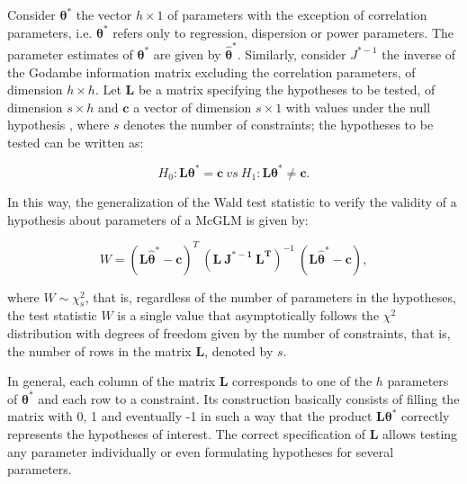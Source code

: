 \documentclass[AMA,STIX1COL]{WileyNJD-v2}
\begin{document}

Consider $\boldsymbol{\theta^{*}}$ the vector $h \times 1$ of parameters with the exception of correlation parameters, i.e. $\boldsymbol{\theta^{*}}$ refers only to regression, dispersion or power parameters. The parameter estimates of $\boldsymbol{\theta^{*}}$ are given by $\boldsymbol{\hat\theta^{*}}$. Similarly, consider $J^{\boldsymbol{*}-1}$ the inverse of the Godambe information matrix excluding the correlation parameters, of dimension $h \times h$. Let $\boldsymbol{L}$ be a matrix specifying the hypotheses to be tested, of dimension $s \times h$ and $\boldsymbol{c}$ a vector of dimension $s \times 1$ with values under the null hypothesis , where $s$ denotes the number of constraints; the hypotheses to be tested can be written as:

\begin{equation}
\label{eq:hipoteses_wald}
H_0: \boldsymbol{L}\boldsymbol{\theta^{*}} = \boldsymbol{c} \ vs \ H_1: \boldsymbol{L}\boldsymbol{\theta^{*}} \neq \boldsymbol{c}. 
\end{equation}

\noindent In this way, the generalization of the Wald test statistic to verify the validity of a hypothesis about parameters of a McGLM is given by:

$$
W = (\boldsymbol{L\hat\theta^{*}} - \boldsymbol{c})^T \ (\boldsymbol{L \ J^{\boldsymbol{*}-1} \ L^T})^{-1} \ (\boldsymbol{L\hat\theta^{*}} - \boldsymbol{c}),
$$

\noindent where $W \sim \chi^2_s$, that is, regardless of the number of parameters in the hypotheses, the test statistic $W$ is a single value that asymptotically follows the $\chi^2$ distribution with degrees of freedom given by the number of constraints, that is, the number of rows in the matrix $\boldsymbol{L}$, denoted by $s$.

In general, each column of the matrix $\boldsymbol{L}$ corresponds to one of the $h$ parameters of $\boldsymbol{\theta^{*}}$ and each row to a constraint. Its construction basically consists of filling the matrix with 0, 1 and eventually -1 in such a way that the product $\boldsymbol{L}\boldsymbol{\theta^{*}}$ correctly represents the hypotheses of interest. The correct specification of $\boldsymbol{L}$ allows testing any parameter individually or even formulating hypotheses for several parameters.
\end{document}
